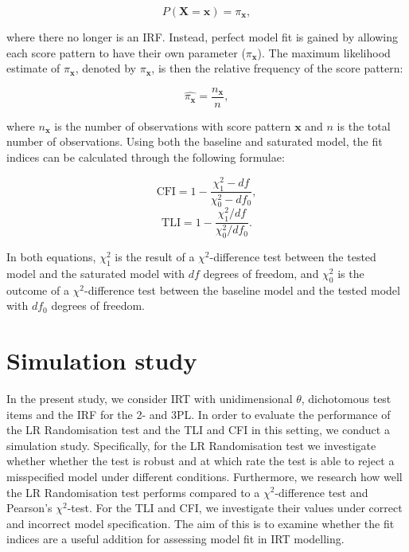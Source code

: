 \documentclass[Royal,sageapa,times,doublespace]{sagej}
\begin{document}
\begin{equation}
P(\boldsymbol{X} = \boldsymbol{x}) = \pi_{\boldsymbol{x}},
\end{equation}

where there no longer is an IRF. Instead, perfect model fit is gained by allowing each score pattern to have their own parameter ($\pi_{\boldsymbol{x}}$). The maximum likelihood estimate of $\pi_{\boldsymbol{x}}$, denoted by $\hat{\pi_{\boldsymbol{x}}}$, is then the relative frequency of the score pattern:

\begin{equation*}
\hat{\pi_{\boldsymbol{x}}} = \frac{n_{\boldsymbol{x}}}{n},
\end{equation*}

where $n_{\boldsymbol{x}}$ is the number of observations with score pattern $\boldsymbol{x}$ and $n$ is the total number of observations. Using both the baseline and saturated model, the fit indices can be calculated through the following formulae:

\begin{equation}
\text{CFI} = 1 - \frac{\chi^{2}_{1} - df}{\chi^{2}_{0} - df_0},
\end{equation}
\begin{equation}
\text{TLI} = 1 - \frac{\chi^{2}_{1}/df}{\chi^{2}_{0}/df_0}.
\end{equation}

In both equations, $\chi^{2}_{1}$ is the result of a $\chi^2$-difference test between the tested model and the saturated model with $df$ degrees of freedom, and $\chi^{2}_{0}$ is the outcome of a $\chi^2$-difference test between the baseline model and the tested model with $df_0$ degrees of freedom.

\section{Simulation study}

In the present study, we consider IRT with unidimensional $\theta$, dichotomous test items and the IRF for the 2- and 3PL. In order to evaluate the performance of the LR Randomisation test and the TLI and CFI in this setting, we conduct a simulation study. Specifically, for the LR Randomisation test we investigate whether whether the test is robust and at which rate the test is able to reject a misspecified model under different conditions. Furthermore, we research how well the LR Randomisation test performs compared to a $\chi^2$-difference test and Pearson's $\chi^2$-test. For the TLI and CFI, we investigate their values under correct and incorrect model specification. The aim of this is to examine whether the fit indices are a useful addition for assessing model fit in IRT modelling.
\end{document}
